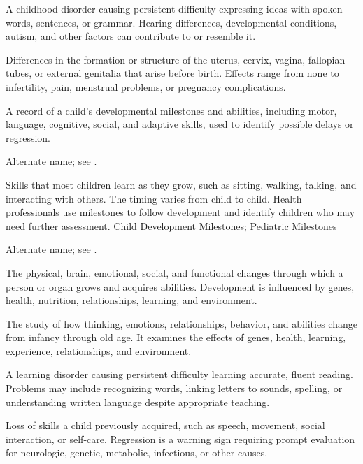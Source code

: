  A childhood disorder causing persistent difficulty expressing ideas with spoken words, sentences, or grammar. Hearing differences, developmental conditions, autism, and other factors can contribute to or resemble it.

 Differences in the formation or structure of the uterus, cervix, vagina, fallopian tubes, or external genitalia that arise before birth. Effects range from none to infertility, pain, menstrual problems, or pregnancy complications.

 A record of a child's developmental milestones and abilities, including motor, language, cognitive, social, and adaptive skills, used to identify possible delays or regression.

 Alternate name; see .

 Skills that most children learn as they grow, such as sitting, walking, talking, and interacting with others. The timing varies from child to child. Health professionals use milestones to follow development and identify children who may need further assessment.
\synonyms
Child Development Milestones; Pediatric Milestones


 Alternate name; see .

 The physical, brain, emotional, social, and functional changes through which a person or organ grows and acquires abilities. Development is influenced by genes, health, nutrition, relationships, learning, and environment.

 The study of how thinking, emotions, relationships, behavior, and abilities change from infancy through old age. It examines the effects of genes, health, learning, experience, relationships, and environment.

 A learning disorder causing persistent difficulty learning accurate, fluent reading. Problems may include recognizing words, linking letters to sounds, spelling, or understanding written language despite appropriate teaching.

 Loss of skills a child previously acquired, such as speech, movement, social interaction, or self-care. Regression is a warning sign requiring prompt evaluation for neurologic, genetic, metabolic, infectious, or other causes.

